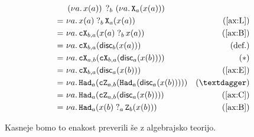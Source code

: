 \begin{align*}
     &\ \measure{b}{\new{a}{x(a)}}{\new{a}{\apply{X}{a}{x(a)}}}                 &\\
    =&\ \new{a}{\measureraw{b}{x(a)}{\apply{X}{a}{x(a)}}}                          &(\ref{ax:L})\\
    =&\ \new{a}{\apply{\ctl X}{b,a}{\measureraw{b}{x(a)}{x(a)}}}                &(\ref{ax:B})\\
    =&\ \new{a}{\apply{\ctl X}{b,a}{\discard{b}{x(a)}}}                         &(\text{def.})\\
    =&\ \new{a}{\apply{\ctl X}{a,b}{\apply{\ctl X}{b,a}{\discard{a}{x(b)}}}}    &(*)\\
    =&\ \new{a}{\apply{\ctl X}{b,a}{\discard{a}{x(b)}}}                         &(\ref{ax:E})\\
    =&\ \new{a}{\apply{\had}{a}{\apply{\ctl Z}{a,b}{\apply{\had}{a}{\discard{a}{x(b)}}}}}&(†)\\
    =&\ \new{a}{\apply{\had}{a}{\apply{\ctl Z}{a,b}{\discard{a}{x(b)}}}}        &(\ref{ax:C})\\
    =&\ \new{a}{\apply{\had}{a}{\measureraw{a}{x(b)}{\apply{Z}{b}{x(b)}}}}      &(\ref{ax:B})
\end{align*}

Kasneje bomo to enakost preverili še z algebrajsko teorijo.